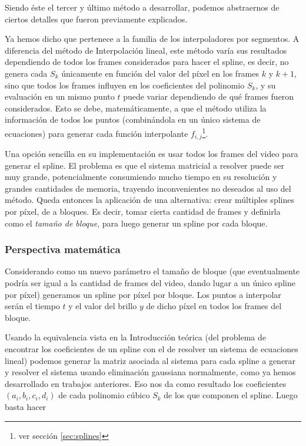 Siendo \'este el tercer y \'ultimo m\'etodo a desarrollar, podemos abstraernos de ciertos detalles que fueron previamente explicados.

Ya hemos dicho que pertenece a la familia de los interpoladores por segmentos. A diferencia del m\'etodo de Interpolaci\'on lineal, este método varía sus resultados dependiendo de todos los frames considerados para hacer el spline, es decir, no genera cada $S_k$ únicamente en función del valor del píxel en los frames $k$ y $k+1$, sino que todos los frames influyen en los coeficientes del polinomio $S_k$, y su evaluación en un mismo punto $t$ puede variar dependiendo de qué frames fueron considerados. Esto se debe, matemáticamente, a que el método utiliza la información de todos los puntos (combinándola en un único sistema de ecuaciones) para generar cada función interpolante $f_{i,j}$\footnote{ver sección \ref{sec:splines}}.

Una opción sencilla en su implementación es usar todos los frames del video para generar el spline. El problema es que el sistema matricial a resolver puede ser muy grande, potencialmente consumiendo mucho tiempo en su resolución y grandes cantidades de memoria, trayendo inconvenientes no deseados al uso del método. Queda entonces la aplicación de una alternativa: crear múltiples splines por píxel, de a bloques. Es decir, tomar cierta cantidad de frames y definirla como el \textit{tamaño de bloque}, para luego generar un spline por cada bloque.

\subsubsection*{\bf{Perspectiva matem\'atica}}
Considerando como un nuevo parámetro el tamaño de bloque (que eventualmente podría ser igual a la cantidad de frames del video, dando lugar a un único spline por píxel) generamos un spline por píxel por bloque. Los puntos a interpolar serán el tiempo $t$ y el valor del brillo $y$ de dicho píxel en todos los frames del bloque.

Usando la equivalencia vista en la Introducción teórica (del problema de encontrar los coeficientes de un spline con el de resolver un sistema de ecuaciones lineal) podemos generar la matriz asociada al sistema para cada spline a generar y resolver el sistema usando eliminación gaussiana normalmente, como ya hemos desarrollado en trabajos anteriores. Eso nos da como resultado los coeficientes $(a_i,b_i,c_i,d_i)$ de cada polinomio cúbico $S_k$ de los que componen el spline. Luego basta hacer

